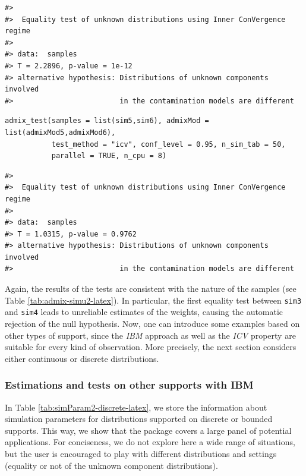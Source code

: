 \begin{verbatim}
#> 
#>  Equality test of unknown distributions using Inner ConVergence regime
#> 
#> data:  samples
#> T = 2.2896, p-value = 1e-12
#> alternative hypothesis: Distributions of unknown components involved 
#>                         in the contamination models are different
\end{verbatim}

\begin{verbatim}
admix_test(samples = list(sim5,sim6), admixMod = list(admixMod5,admixMod6),
           test_method = "icv", conf_level = 0.95, n_sim_tab = 50,
           parallel = TRUE, n_cpu = 8)
\end{verbatim}

\begin{verbatim}
#> 
#>  Equality test of unknown distributions using Inner ConVergence regime
#> 
#> data:  samples
#> T = 1.0315, p-value = 0.9762
#> alternative hypothesis: Distributions of unknown components involved 
#>                         in the contamination models are different
\end{verbatim}

Again, the results of the tests are consistent with the nature of the samples (see Table \ref{tab:admix-simu2-latex}). In particular, the first equality test between \texttt{sim3} and \texttt{sim4} leads to unreliable estimates of the weights, causing the automatic rejection of the null hypothesis. Now, one can introduce some examples based on other types of support, since the \emph{IBM} approach as well as the \emph{ICV} property are suitable for every kind of observation. More precisely, the next section considers either continuous or discrete distributions.

\subsubsection{Estimations and tests on other supports with IBM}\label{estimations-and-tests-on-other-supports-with-ibm}

In Table \ref{tab:simParam2-discrete-latex}, we store the information about simulation parameters for distributions supported on discrete or bounded supports. This way, we show that the package covers a large panel of potential applications. For conciseness, we do not explore here a wide range of situations, but the user is encouraged to play with different distributions and settings (equality or not of the unknown component distributions).

